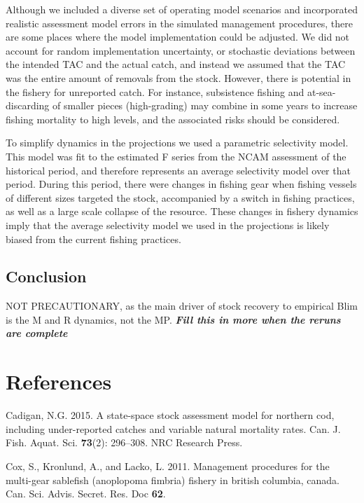 \documentclass[12pt,]{article}
\begin{document}
Although we included a diverse set of operating model scenarios and
incorporated realistic assessment model errors in the simulated
management procedures, there are some places where the model
implementation could be adjusted. We did not account for random
implementation uncertainty, or stochastic deviations between the
intended TAC and the actual catch, and instead we assumed that the TAC
was the entire amount of removals from the stock. However, there is
potential in the fishery for unreported catch. For instance, subsistence
fishing and at-sea-discarding of smaller pieces (high-grading) may
combine in some years to increase fishing mortality to high levels, and
the associated risks should be considered.

To simplify dynamics in the projections we used a parametric selectivity
model. This model was fit to the estimated F series from the NCAM
assessment of the historical period, and therefore represents an average
selectivity model over that period. During this period, there were
changes in fishing gear when fishing vessels of different sizes targeted
the stock, accompanied by a switch in fishing practices, as well as a
large scale collapse of the resource. These changes in fishery dynamics
imply that the average selectivity model we used in the projections is
likely biased from the current fishing practices.

\subsection{Conclusion}\label{conclusion}

NOT PRECAUTIONARY, as the main driver of stock recovery to empirical
Blim is the M and R dynamics, not the MP. \textbf{\emph{Fill this in
more when the reruns are complete}}

\section*{References}\label{references}

\hypertarget{refs}{}
\hypertarget{ref-cadigan2015state}{}
Cadigan, N.G. 2015. A state-space stock assessment model for northern
cod, including under-reported catches and variable natural mortality
rates. Can. J. Fish. Aquat. Sci. \textbf{73}(2): 296--308. NRC Research
Press.

\hypertarget{ref-cox2011management}{}
Cox, S., Kronlund, A., and Lacko, L. 2011. Management procedures for the
multi-gear sablefish (anoplopoma fimbria) fishery in british columbia,
canada. Can. Sci. Advis. Secret. Res. Doc \textbf{62}.
\end{document}
